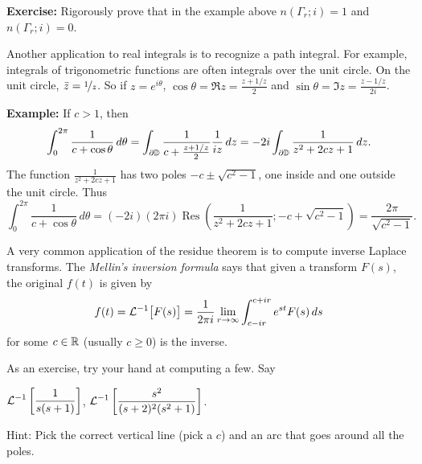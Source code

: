 \documentclass[10pt,aspectratio=169]{beamer}
\begin{document}
\begin{frame}
\medskip
\pause

\textbf{Exercise:}
Rigorously prove that in the example above
$n(\Gamma_r;i) = 1$ and
$n(\Gamma_r;i) = 0$.

\end{frame}

\begin{frame}

Another application to real integrals is to recognize 
a path integral.  For example, integrals of trigonometric functions
are often integrals over the unit circle.  On the unit
circle, $\bar{z} = \nicefrac{1}{z}$.  So if $z=e^{i\theta}$,
$\cos \theta = \Re z = \frac{z+1/z}{2}$ and
$\sin \theta = \Im z = \frac{z-1/z}{2i}$.

\textbf{Example:}
If $c > 1$, then
\begin{equation*}
\int_0^{2\pi} \frac{1}{c+\cos \theta} \, d\theta 
=
\int_{\partial {\mathbb{D}}} \frac{1}{c+\frac{z+1/z}{2}} \frac{1}{iz} \, dz
=
-2i
\int_{\partial {\mathbb{D}}} \frac{1}{z^2 + 2cz + 1} \, dz
.
\end{equation*}
The function $\frac{1}{z^2 + 2cz + 1}$ has two poles $-c \pm \sqrt{c^2-1}$,
one inside and one outside the unit circle.  Thus
\begin{equation*}
\int_0^{2\pi} \frac{1}{c+\cos \theta} \, d\theta 
=
(-2i)
(2 \pi i)
\operatorname{Res}
\left(\frac{1}{z^2 + 2cz + 1}; -c+\sqrt{c^2-1}\right)
=
\frac{2\pi}{\sqrt{c^2-1}}
.
\end{equation*}

\end{frame}

\begin{frame}

A very common application of the residue theorem is to compute
inverse Laplace transforms.
The \emph{Mellin's inversion formula} says that given a transform $F(s)$,
the original $f(t)$ is given by
\begin{equation*}
f(t) = {\mathcal{L}}^{-1}\bigl[F(s)\bigr] =
\frac{1}{2 \pi i }
\lim_{r \to \infty}
\int_{c-ir}^{c+ir}
e^{st}F(s) \, ds
\end{equation*}
for some $c \in {\mathbb{R}}$ (usually $c \geq 0$) is the inverse.

\medskip
\pause

As an exercise, try your hand at computing a few.  Say

\medskip

\quad$\displaystyle {\mathcal{L}}^{-1}\left[ \frac{1}{s(s+1)} \right]$,
\qquad {} \qquad
$\displaystyle {\mathcal{L}}^{-1}\left[ \frac{s^2}{(s+2)^2(s^2+1)} \right]$.

\medskip
\pause
Hint: Pick the correct vertical line (pick a $c$) and an arc that goes
around all the poles.
\end{frame}
\end{document}
